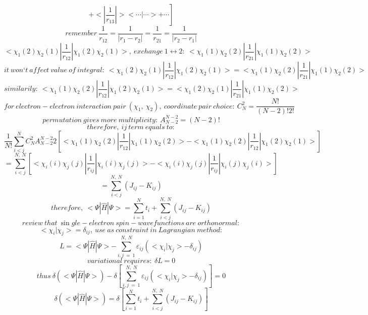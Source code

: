 $$
\left. +<|\frac{1}{r_{13}}|><\cdots |\cdots >+\cdots \right] 
$$
$$
remember\ \frac{1}{r_{12}}=\frac{1}{|r_1-r_2|}=\frac{1}{r_{21}}=\frac{1}{|r_2-r_1|}
$$
$$
<\chi _1\left( 2 \right) \chi _2\left( 1 \right) |\frac{1}{r_{12}}|\chi _1\left( 2 \right) \chi _2\left( 1 \right) >,\ exchange\ 1\leftrightarrow 2:\ <\chi _1\left( 1 \right) \chi _2\left( 2 \right) |\frac{1}{r_{21}}|\chi _1\left( 1 \right) \chi _2\left( 2 \right) >
$$
$$
it\ wont\ affect\ value\ of\ integral:\ <\chi _1\left( 2 \right) \chi _2\left( 1 \right) |\frac{1}{r_{12}}|\chi _1\left( 2 \right) \chi _2\left( 1 \right) >=<\chi _1\left( 1 \right) \chi _2\left( 2 \right) |\frac{1}{r_{21}}|\chi _1\left( 1 \right) \chi _2\left( 2 \right) >
$$
$$
similarily:\ <\chi _1\left( 1 \right) \chi _2\left( 2 \right) |\frac{1}{r_{12}}|\chi _1\left( 2 \right) \chi _2\left( 1 \right) >=<\chi _1\left( 2 \right) \chi _2\left( 1 \right) |\frac{1}{r_{21}}|\chi _1\left( 1 \right) \chi _2\left( 2 \right) >
$$
$$
for\ electron-electron\ interaction\ pair\ \left( \chi _1,\ \chi _2 \right) ,\ coordinate\ pair\ choice:\ C_{N}^{2}=\frac{N!}{\left( N-2 \right) !2!}
$$
$$
permutation\ gives\ more\ multiplicity:\ A_{N-2}^{N-2}=\left( N-2 \right) !
$$
$$
therefore,\ ij\ term\ equals\ to:
$$
$$
\frac{1}{N!}\sum_{i<j}^N{C_{N}^{2}A_{N-2}^{N-2}2\left[ <\chi _1\left( 1 \right) \chi _2\left( 2 \right) |\frac{1}{r_{12}}|\chi _1\left( 1 \right) \chi _2\left( 2 \right) >-<\chi _1\left( 1 \right) \chi _2\left( 2 \right) |\frac{1}{r_{12}}|\chi _1\left( 2 \right) \chi _2\left( 1 \right) > \right]}
$$
$$
=\sum_{i<j}^{N,\ N}{\left[ <\chi _i\left( i \right) \chi _j\left( j \right) |\frac{1}{r_{ij}}|\chi _i\left( i \right) \chi _j\left( j \right) >-<\chi _i\left( i \right) \chi _j\left( j \right) |\frac{1}{r_{ij}}|\chi _i\left( j \right) \chi _j\left( i \right) > \right]}
$$
$$
=\sum_{i<j}^{N,\ N}{\left( J_{ij}-K_{ij} \right)}
$$
$$
therefore,\ <\varPsi |\hat{H}|\varPsi >=\sum_{i=1}^N{t_i}+\sum_{i<j}^{N,\ N}{\left( J_{ij}-K_{ij} \right)}
$$
$$
review\ that\ \sin gle-electron\ spin-wavefunctions\ are\ orthonormal:
$$
$$
<\chi _i|\chi _j>=\delta _{ij},\ use\ as\ constraint\ in\ Lagrangian\ method:
$$
$$
L=<\varPsi |\hat{H}|\varPsi >-\sum_{i,j\ =\ 1}^{N,\ N}{\varepsilon _{ij}\left( <\chi _i|\chi _j>-\delta _{ij} \right)}
$$
$$
variational\ requires:\ \delta L=0
$$
$$
thus\ \delta \left( <\varPsi |\hat{H}|\varPsi > \right) -\delta \left[ \sum_{i,j\ =\ 1}^{N,\ N}{\varepsilon _{ij}\left( <\chi _i|\chi _j>-\delta _{ij} \right)} \right] =0
$$
$$
\delta \left( <\varPsi |\hat{H}|\varPsi > \right) =\delta \left[ \sum_{i=1}^N{t_i}+\sum_{i<j}^{N,\ N}{\left( J_{ij}-K_{ij} \right)} \right] 
$$
